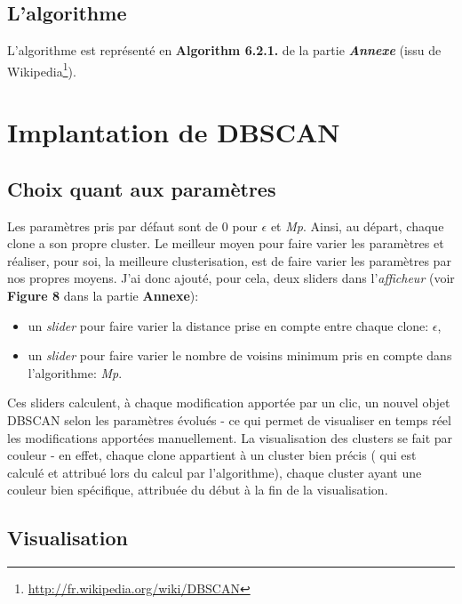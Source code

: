 \documentclass[12pt]{report}
\begin{document}
\begin{spacing}{1.2}
\subsection{L'algorithme}

L'algorithme est représenté en \textbf{Algorithm 6.2.1.} de la partie \textbf{\textit{Annexe}} (issu de Wikipedia\footnote{\url{http://fr.wikipedia.org/wiki/DBSCAN}}).

\section{Implantation de DBSCAN}

\subsection{Choix quant aux paramètres}

Les paramètres pris par défaut sont de 0 pour $\epsilon$ et \textit{Mp}. Ainsi, au départ, chaque clone a son propre cluster.
\newline
Le meilleur moyen pour faire varier les paramètres et réaliser, pour soi, la meilleure clusterisation, est de faire varier les paramètres par nos propres moyens.
\newline
J'ai donc ajouté, pour cela, deux sliders dans l'\textit{afficheur} (voir \textbf{Figure 8} dans la partie \textbf{Annexe}):
	\begin{itemize}
	\item{un \textit{slider} pour faire varier la distance prise en compte entre chaque clone: $\epsilon$,}
	\item{un \textit{slider} pour faire varier le nombre de voisins minimum pris en compte dans l'algorithme: \textit{Mp}.}
	\end{itemize}
Ces sliders calculent, à chaque modification apportée par un clic, un nouvel objet DBSCAN selon les paramètres évolués - ce qui permet de visualiser en temps réel les modifications apportées manuellement.
\newline
La visualisation des clusters se fait par couleur - en effet, chaque clone appartient à un cluster bien précis ( qui est calculé et attribué lors du calcul par l'algorithme), chaque cluster ayant une couleur bien spécifique, attribuée du début à la fin de la visualisation.

\subsection{Visualisation}


\end{spacing}
\end{document}

